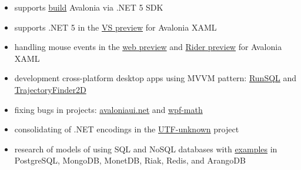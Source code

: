 \documentclass[10pt,a4paper,ragged2e,withhyper]{altacv}
\begin{document}
\begin{paracol}{2}
\begin{itemize}
  \item supports
  \href{https://github.com/AvaloniaUI/Avalonia/pull/5415}{build}
  Avalonia via .NET 5 SDK
  \smallskip

  \item supports .NET 5 in the
  \href{https://github.com/AvaloniaUI/AvaloniaVS/pull/181}{VS preview}
  for Avalonia XAML
  \smallskip

  \item handling mouse events in the
  \href{https://github.com/AvaloniaUI/Avalonia/pull/4418}{web preview}
  and \href{https://github.com/ForNeVeR/AvaloniaRider/pull/82}{Rider preview}
  for \newline Avalonia XAML
  \smallskip

  \item development cross-platform desktop apps using MVVM pattern:
  \newline \href{https://github.com/rstm-sf/RunSQL}{RunSQL}
  and \href{https://github.com/rstm-sf/TrajectoryFinder2D}{TrajectoryFinder2D}
  \smallskip

  \item fixing bugs in projects:
  \href{https://github.com/AvaloniaUI/avaloniaui.net/commits?author=rstm-sf}{avaloniaui.net}
  and \href{https://github.com/ForNeVeR/wpf-math/commits?author=rstm-sf}{wpf-math}
  \smallskip

  \item consolidating of .NET encodings in the
  \href{https://github.com/CharsetDetector/UTF-unknown/commits?author=rstm-sf}{UTF-unknown} project
  \smallskip

  \item research of models of using SQL and NoSQL databases with
  \href{https://bitbucket.org/rstm-sf/game_with_db}{examples}
  in PostgreSQL, MongoDB, MonetDB, Riak, Redis, and ArangoDB

\end{itemize}

\switchcolumn




\smallskip
{}



\end{paracol}
\end{document}
